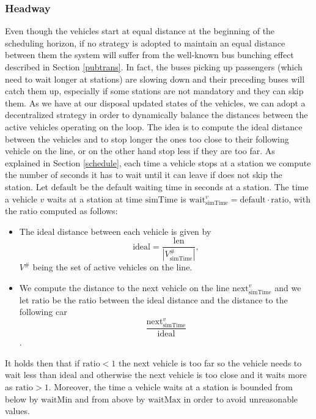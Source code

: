 \documentclass[12pt,a4paper]{article}
\begin{document}
\subsubsection{Headway}\label{hw}
Even though the vehicles start at equal distance at the beginning of the scheduling horizon, if no strategy is adopted to maintain an equal distance between them the system will suffer from the well-known bus bunching effect described in Section \ref{pubtrans}. In fact, the buses picking up passengers (which need to wait longer at stations) are slowing down and their preceding buses will catch them up, especially if some stations are not mandatory and they can skip them. As we have at our disposal updated states of the vehicles, we can adopt a decentralized strategy in order to dynamically balance the distances between the active vehicles operating on the loop. The idea is to compute the ideal distance between the vehicles and to stop longer the ones too close to their following vehicle on the line, or on the other hand stop less if they are too far. As explained in Section \ref{schedule}, each time a vehicle stops at a station we compute the number of seconds it has to wait until it can leave if does not skip the station. Let $\text{default}$ be the default waiting time in seconds at a station. The time a vehicle $v$ waits at a station at time $\text{simTime}$ is $\text{wait}^{v}_{\text{simTime}} = \text{default} \cdot \text{ratio}$, with the $\text{ratio}$ computed as follows:
\begin{itemize}
\setlength\itemsep{1pt}
\item The ideal distance between each vehicle is given by $$\text{ideal} = \frac{\text{len}}{|V^{\#}_{\text{simTime}}|},$$ $V^{\#}$ being the set of active vehicles on the line.
\item We compute the distance to the next vehicle on the line $\text{next}^{v}_{\text{simTime}}$ and we let $\text{ratio}$ be the ratio between the ideal distance and the distance to the following car $$\frac{\text{next}^{v}_{\text{simTime}}}{\text{ideal}}$$.
\end{itemize}
It holds then that if $\text{ratio} < 1$ the next vehicle is too far so the vehicle needs to wait less than $\text{ideal}$ and otherwise the next vehicle is too close and it waits more as $\text{ratio} >1$. Moreover, the time a vehicle waits at a station is bounded from below by $\text{waitMin}$ and from above by $\text{waitMax}$ in order to avoid unreasonable values.
\end{document}
